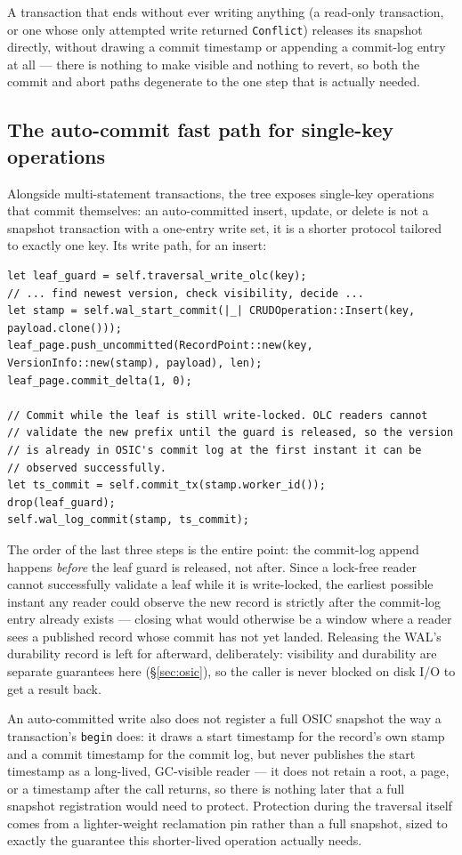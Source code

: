 \documentclass[11pt]{article}
\newcommand{\code}[1]{\texttt{#1}}
\begin{document}
A transaction that ends without ever writing anything (a read-only transaction, or
one whose only attempted write returned \code{Conflict}) releases its snapshot
directly, without drawing a commit timestamp or appending a commit-log entry at all
--- there is nothing to make visible and nothing to revert, so both the commit and
abort paths degenerate to the one step that is actually needed.

\subsection{The auto-commit fast path for single-key operations}

Alongside multi-statement transactions, the tree exposes single-key operations that
commit themselves: an auto-committed insert, update, or delete is not a snapshot
transaction with a one-entry write set, it is a shorter protocol tailored to exactly
one key. Its write path, for an insert:

\begin{lstlisting}
let leaf_guard = self.traversal_write_olc(key);
// ... find newest version, check visibility, decide ...
let stamp = self.wal_start_commit(|_| CRUDOperation::Insert(key, payload.clone()));
leaf_page.push_uncommitted(RecordPoint::new(key, VersionInfo::new(stamp), payload), len);
leaf_page.commit_delta(1, 0);

// Commit while the leaf is still write-locked. OLC readers cannot
// validate the new prefix until the guard is released, so the version
// is already in OSIC's commit log at the first instant it can be
// observed successfully.
let ts_commit = self.commit_tx(stamp.worker_id());
drop(leaf_guard);
self.wal_log_commit(stamp, ts_commit);
\end{lstlisting}

The order of the last three steps is the entire point: the commit-log append happens
\emph{before} the leaf guard is released, not after. Since a lock-free reader cannot
successfully validate a leaf while it is write-locked, the earliest possible instant
any reader could observe the new record is strictly after the commit-log entry
already exists --- closing what would otherwise be a window where a reader sees a
published record whose commit has not yet landed. Releasing the WAL's durability
record is left for afterward, deliberately: visibility and durability are separate
guarantees here (\S\ref{sec:osic}), so the caller is never blocked on disk I/O to get
a result back.

An auto-committed write also does not register a full OSIC snapshot the way a
transaction's \code{begin} does: it draws a start timestamp for the record's own
stamp and a commit timestamp for the commit log, but never publishes the start
timestamp as a long-lived, GC-visible reader --- it does not retain a root, a page,
or a timestamp after the call returns, so there is nothing later that a full
snapshot registration would need to protect. Protection during the traversal itself
comes from a lighter-weight reclamation pin rather than a full snapshot, sized to
exactly the guarantee this shorter-lived operation actually needs.
\end{document}
